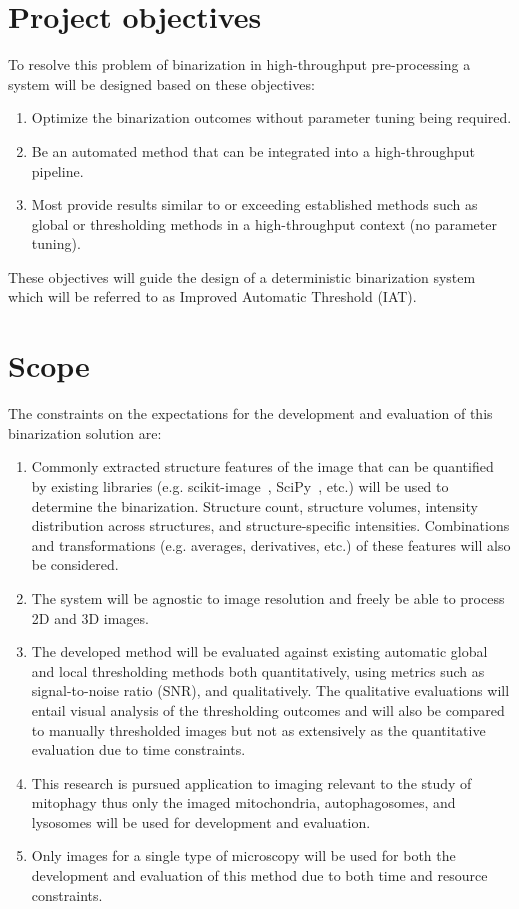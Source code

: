 \section{Project objectives}\label{sec:objectives}
To resolve this problem of binarization in high-throughput pre-processing a system will be designed based on these objectives:
\begin{enumerate}
    \item Optimize the binarization outcomes without parameter tuning being required.
    \item Be an automated method that can be integrated into a high-throughput pipeline.
    \item Most provide results similar to or exceeding established methods such as global or thresholding methods in a high-throughput context (no parameter tuning).
\end{enumerate}
These objectives will guide the design of a deterministic binarization system which will be referred to as Improved Automatic Threshold (IAT).

\section{Scope}
The constraints on the expectations for the development and evaluation of this binarization solution are:
\begin{enumerate}
    \item Commonly extracted structure features of the image that can be quantified by existing libraries (e.g. scikit-image~\cite{scikit-image}, SciPy~\cite{scipy}, etc.)  will be used to determine the binarization. Structure count, structure volumes, intensity distribution across structures, and structure-specific intensities. Combinations and transformations (e.g. averages, derivatives, etc.) of these features will also be considered.
    \item The system will be agnostic to image resolution and freely be able to process 2D and 3D images.
    \item The developed method will be evaluated against existing automatic global and local thresholding methods both quantitatively, using metrics such as signal-to-noise ratio (SNR), and qualitatively. The qualitative evaluations will entail visual analysis of the thresholding outcomes and will also be compared to manually thresholded images but not as extensively as the quantitative evaluation due to time constraints.
    \item This research is pursued application to imaging relevant to the study of mitophagy thus only the imaged mitochondria, autophagosomes, and lysosomes will be used for development and evaluation.
    \item Only images for a single type of microscopy will be used for both the development and evaluation of this method due to both time and resource constraints.
\end{enumerate}


